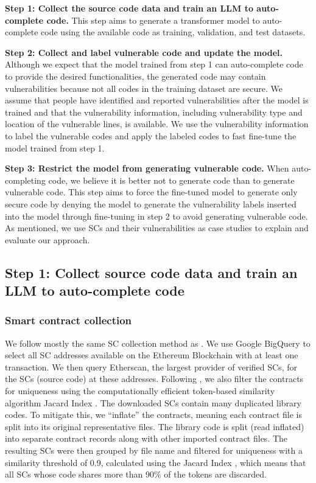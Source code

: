 \documentclass[12pt]{book}
\begin{document}
\textbf{Step 1: Collect the source code data and train an LLM to auto-complete code.}
This step aims to generate a transformer model to auto-complete code using the available code as training, validation, and test datasets. 

\textbf{Step 2: Collect and label vulnerable code and update the model.} 
Although we expect that the model trained from step 1 can auto-complete code to provide the desired functionalities, the generated code may contain vulnerabilities because not all codes in the training dataset are secure. We assume that people have identified and reported vulnerabilities after the model is trained and that the vulnerability information, including vulnerability type and location of the vulnerable lines, is available. We use the vulnerability information to label the vulnerable codes and apply the labeled codes to fast fine-tune the model trained from step 1. 

\textbf{Step 3: Restrict the model from generating vulnerable code.} 
When auto-completing code, we believe it is better not to generate code than to generate vulnerable code. This step aims to force the fine-tuned model to generate only secure code by denying the model to generate the vulnerability labels inserted into the model through fine-tuning in step 2 to avoid  generating vulnerable code. As mentioned, we use SCs and their vulnerabilities as case studies to explain and evaluate our approach. 


\subsection{Step 1: Collect source code data and train an LLM to auto-complete code}
\subsubsection{Smart contract collection}
\label{sec:smart-contract-collection}
We follow mostly the same SC collection method as \cite{Hu2023}. We use Google BigQuery to select all SC addresses available on the Ethereum Blockchain with at least one transaction. We then query Etherscan, the largest provider of verified SCs, for the SCs (source code) at these addresses. Following \cite{Hu2023}, we also filter the contracts for uniqueness using the computationally efficient token-based similarity algorithm Jacard Index \cite{allamanis_adverse_2019}. The downloaded SCs contain many duplicated library codes. To mitigate this, we ``inflate'' the contracts, meaning each contract file is split into its original representative files. The library code is split (read inflated) into separate contract records along with other imported contract files. The resulting SCs were then grouped by file name and filtered for uniqueness with a similarity threshold of 0.9, calculated using the Jacard Index \cite{jaccard}, which means that all SCs whose code shares more than 90\% of the tokens are discarded. 
\end{document}
